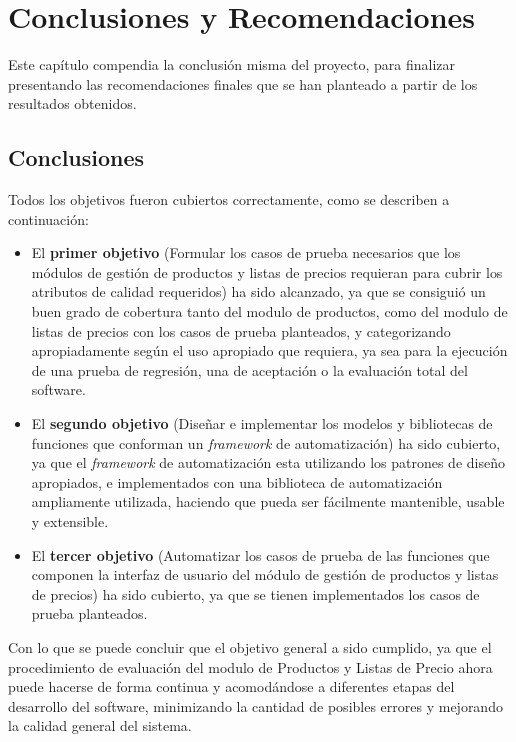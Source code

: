 \chapter{Conclusiones y Recomendaciones}

Este capítulo compendia la conclusión misma del proyecto, para finalizar
presentando las recomendaciones finales que se han planteado a partir de los
resultados obtenidos.

\section{Conclusiones}
Todos los objetivos fueron cubiertos correctamente, como se describen a
continuación:

\begin{itemize}
\item El \textbf{primer objetivo} (Formular los casos de prueba necesarios que
los módulos de gestión de productos y listas de precios requieran para cubrir
los atributos de calidad requeridos) ha sido alcanzado, ya que se consiguió un
buen grado de cobertura tanto del modulo de productos, como del modulo de listas
de precios con los casos de prueba planteados, y categorizando apropiadamente
según el uso apropiado que requiera, ya sea para la ejecución de una prueba de
regresión, una de aceptación o la evaluación total del software.
\item El \textbf{segundo objetivo} (Diseñar e implementar los modelos y
bibliotecas de funciones que conforman un \emph{framework} de automatización)
ha sido cubierto, ya que el \emph{framework} de automatización esta utilizando
los patrones de diseño apropiados, e implementados con una biblioteca de
automatización ampliamente utilizada, haciendo que pueda ser fácilmente
mantenible, usable y extensible.
\item El \textbf{tercer objetivo} (Automatizar los casos de prueba de las
funciones que componen la interfaz de usuario del módulo de gestión de productos
y listas de precios) ha sido cubierto, ya que se tienen implementados los casos
de prueba planteados.
\end{itemize}

Con lo que se puede concluir que el objetivo general a sido cumplido, ya que el
procedimiento de evaluación del modulo de Productos y Listas de Precio ahora
puede hacerse de forma continua y acomodándose a diferentes etapas del
desarrollo del software, minimizando la cantidad de posibles errores y mejorando
la calidad general del sistema.

